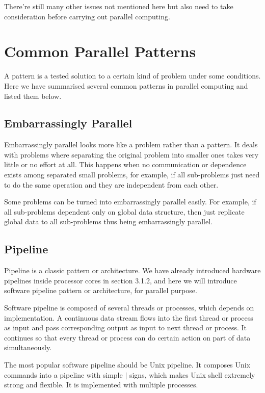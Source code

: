 \documentclass[12pt,a4paper]{report}
\begin{document}
There're still many other issues not mentioned here but also need to take consideration before carrying out parallel computing.

\section{Common Parallel Patterns}

A pattern is a tested solution to a certain kind of problem under some conditions. Here we have summarised several common patterns in parallel computing and listed them below.

\subsection{Embarrassingly Parallel}

Embarrassingly parallel looks more like a problem rather than a pattern. It deals with problems where separating the original problem into smaller ones takes very little or no effort at all. This happens when no communication or dependence exists among separated small problems, for example, if all sub-problems just need to do the same operation and they are independent from each other.

Some problems can be turned into embarrassingly parallel easily. For example, if all sub-problems dependent only on global data structure, then just replicate global data to all sub-problems thus being embarrassingly parallel.

\subsection{Pipeline}

Pipeline is a classic pattern or architecture. We have already introduced hardware pipelines inside processor cores in section 3.1.2, and here we will introduce software pipeline pattern or architecture, for parallel purpose.

Software pipeline is composed of several threads or processes, which depends on implementation. A continuous data stream flows into the first thread or process as input and pass corresponding output as input to next thread or process. It continues so that every thread or process can do certain action on part of data simultaneously.

The most popular software pipeline should be Unix pipeline. It composes Unix commands into a pipeline with simple $\mid$ signs, which makes Unix shell extremely strong and flexible. It is implemented with multiple processes.
\end{document}
